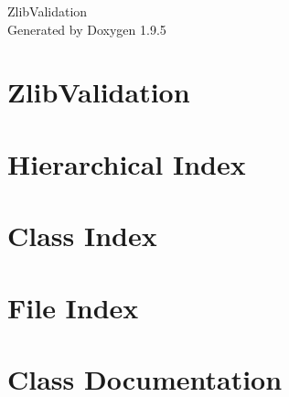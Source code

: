 \documentclass[twoside]{book}
\newcommand{\+}{\discretionary{\mbox{\scriptsize$\hookleftarrow$}}{}{}}
\newcommand{\clearemptydoublepage}{%
    \newpage{\pagestyle{empty}\cleardoublepage}%
  }
\begin{document}
  \raggedbottom
    \hypersetup{pageanchor=false,
                bookmarksnumbered=true,
                pdfencoding=unicode
               }
  \begin{titlepage}
  \vspace*{7cm}
  \begin{center}%
  {\Large Zlib\+Validation}\\
  \vspace*{1cm}
  {\large Generated by Doxygen 1.9.5}\\
  \end{center}
  \end{titlepage}
  \clearemptydoublepage
  \tableofcontents
  \clearemptydoublepage
  \hypersetup{pageanchor=true}
\chapter{Zlib\+Validation}
\label{md_README}

\chapter{Hierarchical Index}

\chapter{Class Index}

\chapter{File Index}

\chapter{Class Documentation}













\end{document}
